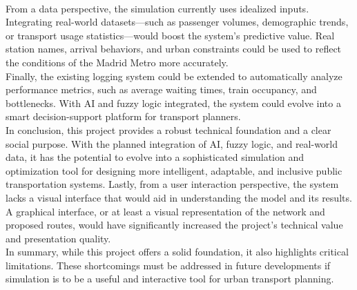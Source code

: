 ~\\[0,5cm]
From a data perspective, the simulation currently uses idealized inputs. Integrating real-world datasets—such as passenger volumes, demographic trends, or transport usage statistics—would boost the system’s predictive value. Real station names, arrival behaviors, and urban constraints could be used to reflect the conditions of the Madrid Metro more accurately.
~\\[0,5cm]
Finally, the existing logging system could be extended to automatically analyze performance metrics, such as average waiting times, train occupancy, and bottlenecks. With AI and fuzzy logic integrated, the system could evolve into a smart decision-support platform for transport planners.
~\\[0,5cm]
In conclusion, this project provides a robust technical foundation and a clear social purpose. With the planned integration of AI, fuzzy logic, and real-world data, it has the potential to evolve into a sophisticated simulation and optimization tool for designing more intelligent, adaptable, and inclusive public transportation systems.
Lastly, from a user interaction perspective, the system lacks a visual interface that would aid in understanding the model and its results. A graphical interface, or at least a visual representation of the network and proposed routes, would have significantly increased the project's technical value and presentation quality.
~\\[0,5cm]
In summary, while this project offers a solid foundation, it also highlights critical limitations. These shortcomings must be addressed in future developments if simulation is to be a useful and interactive tool for urban transport planning.


